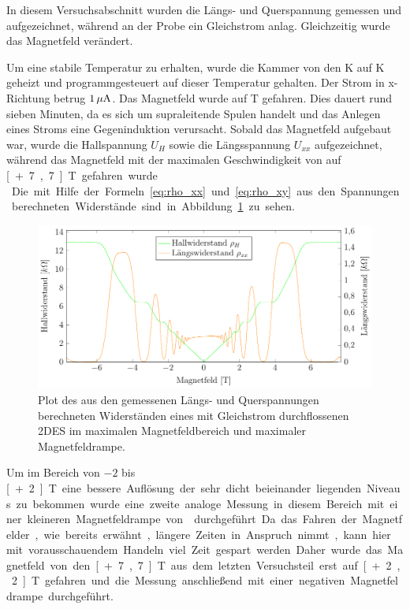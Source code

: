 
In diesem Versuchsabschnitt wurden die Längs- und Querspannung gemessen und aufgezeichnet, während an der Probe ein Gleichstrom anlag. Gleichzeitig wurde das Magnetfeld verändert.

Um eine stabile Temperatur zu erhalten, wurde die Kammer von den \unit[1,5]{K} auf \unit[2]{K} geheizt und programmgesteuert auf dieser Temperatur gehalten. Der Strom in x-Richtung betrug $\unit[1]{\mu A}$. Das Magnetfeld wurde auf \unit[-7,7]{T} gefahren. Dies dauert rund sieben Minuten, da es sich um supraleitende Spulen handelt und das Anlegen eines Stroms eine Gegeninduktion verursacht. Sobald das Magnetfeld aufgebaut war, wurde die Hallspannung $U_H$ sowie die Längsspannung $U_{xx}$ aufgezeichnet, während das Magnetfeld mit der maximalen Geschwindigkeit von  auf \unit[+7,7]{T} gefahren wurde.\\

Die mit Hilfe der Formeln~\eqref{eq:rho_xx} und \eqref{eq:rho_xy} aus den Spannungen berechneten Widerstände sind in Abbildung~\ref{fig:full_range_dc} zu sehen.

\begin{figure}[h]
	\centering
	\includegraphics[scale=1]{graphs/dc/full_range.pdf}
	\caption[Gleichstrommessung im maximalen Magnetfeldbereich]{
		Plot des aus den gemessenen Längs- und Querspannungen berechneten Widerständen eines mit Gleichstrom durchflossenen 2DES im maximalen Magnetfeldbereich und maximaler Magnetfeldrampe.
	}
	\label{fig:full_range_dc}
\end{figure}

Um im Bereich von $-2$ bis \unit[+2]{T} eine bessere Auflösung der sehr dicht beieinander liegenden Niveaus zu bekommen wurde eine zweite analoge Messung in diesem Bereich mit einer kleineren Magnetfeldrampe von  durchgeführt. Da das Fahren der Magnetfelder, wie bereits erwähnt, längere Zeiten in Anspruch nimmt, kann hier mit vorausschauendem Handeln viel Zeit gespart werden. Daher wurde das Magnetfeld von den \unit[+7,7]{T} aus dem letzten Versuchsteil erst auf \unit[+2,2]{T} gefahren und die Messung anschließend mit einer negativen Magnetfeldrampe durchgeführt.


